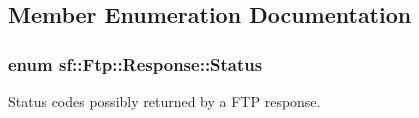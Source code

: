 \subsection{Member Enumeration Documentation}
\hypertarget{classsf_1_1_ftp_1_1_response_af81738f06b6f571761696291276acb3b}{
\subsubsection[{Status}]{\setlength{\rightskip}{0pt plus 5cm}enum {\bf sf\-::\-Ftp\-::\-Response\-::\-Status}}}\label{classsf_1_1_ftp_1_1_response_af81738f06b6f571761696291276acb3b}


Status codes possibly returned by a F\-T\-P response. 

